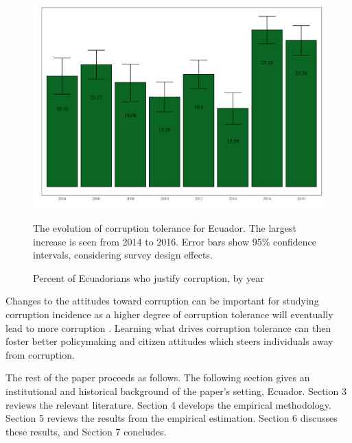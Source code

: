 \documentclass[12pt,a4]{article}
\makeatletter
\def\maxwidth{ %
  \ifdim\Gin@nat@width>\linewidth
    \linewidth
  \else
    \Gin@nat@width
  \fi
}
\newenvironment{knitrout}{}{} %
\makeatother
\begin{document}

\begin{figure}[htbp]
\label{fig:ctoly}
\begin{knitrout}
\color{fgcolor}

{\centering \includegraphics[width=\maxwidth]{figure/ctol_graph-1} 

}


\end{knitrout}
\caption{Percent of Ecuadorians who justify corruption, by year}
The evolution of corruption tolerance for Ecuador. The largest increase is seen from 2014 to 2016. Error bars show 95\% confidence intervals, considering survey design effects.
\end{figure}

Changes to the attitudes toward corruption can be important for studying corruption incidence as a higher degree of corruption tolerance will eventually lead to more corruption \parencite{Campbell.2014, Ariely.2019}. Learning what drives corruption tolerance can then foster better policymaking and citizen attitudes which steers individuals away from corruption.

The rest of the paper proceeds as follows. The following section gives an institutional and historical background of the paper's setting, Ecuador. Section 3 reviews the relevant literature. Section 4 develops the empirical methodology. Section 5 reviews the results from the empirical estimation. Section 6 discusses these results, and Section 7 concludes. 
\end{document}
